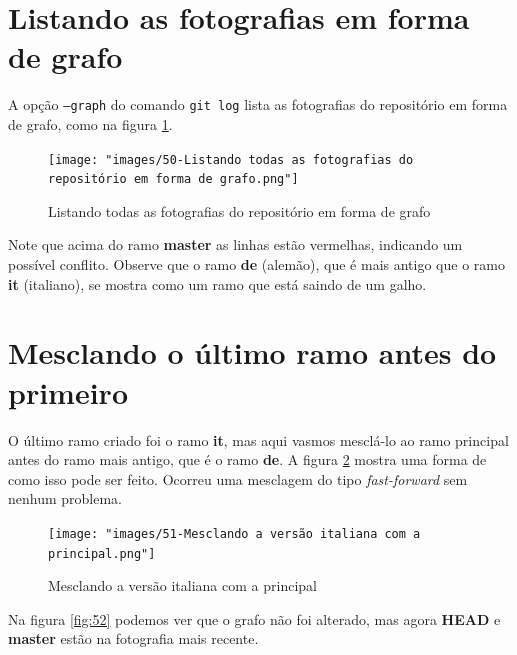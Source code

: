 \documentclass[a4paper]{book}
\begin{document}
\section{Listando as fotografias em forma de grafo}

A opção \texttt{--graph} do comando \texttt{git log}
lista as fotografias do repositório em forma de grafo,
como na figura \ref{fig:50}.


\begin{figure}[!h]
\caption{Listando todas as fotografias do repositório em forma de grafo}
\label{fig:50}
\centering
\texttt{[image: "images/50-Listando todas as fotografias do repositório em forma de grafo.png"]}
\end{figure}

Note que acima do ramo \textbf{master} as linhas estão
vermelhas, indicando um possível conflito.
Observe que o ramo \textbf{de} (alemão), que é mais
antigo que o ramo \textbf{it} (italiano), se mostra como
um ramo que está saindo de um galho.



\section{Mesclando o último ramo antes do primeiro}

O último ramo criado foi o ramo \textbf{it},
mas aqui vasmos mesclá-lo ao ramo principal
antes do ramo mais antigo, que é o ramo \textbf{de}.
A figura \ref{fig:51} mostra uma forma de como isso 
pode ser feito.
Ocorreu uma mesclagem do tipo \textit{fast-forward}
sem nenhum problema.

\begin{figure}[ht]
\caption{Mesclando a versão italiana com a principal}
\label{fig:51}
\centering
\texttt{[image: "images/51-Mesclando a versão italiana com a principal.png"]}
\end{figure}

Na figura \ref{fig:52} podemos ver que o grafo não foi 
alterado, mas agora \textbf{HEAD} e \textbf{master}
estão na fotografia mais recente.
\end{document}
